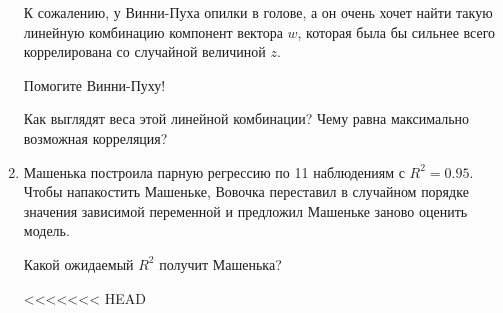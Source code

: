 \begin{enumerate}
   К сожалению, у Винни-Пуха опилки в голове, а он очень хочет найти такую линейную комбинацию
   компонент вектора $w$, которая была бы сильнее всего коррелирована со случайной
   величиной $z$.

   Помогите Винни-Пуху!

   Как выглядят веса этой линейной комбинации?
   Чему равна максимально возможная корреляция?

 \item Машенька построила парную регрессию по 11 наблюдениям с $R^2=
0.95$. Чтобы напакостить Машеньке, Вовочка переставил в случайном
порядке значения зависимой переменной и предложил Машеньке заново оценить модель.

Какой ожидаемый $R^2$ получит Машенька?


<<<<<<< HEAD
\end{enumerate}


